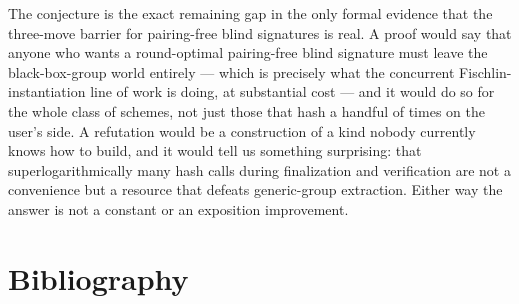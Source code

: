 \documentclass{conjura-conjecture}
\begin{document}
\begin{remark}\label{rem:consequence}
The conjecture is the exact remaining gap in the only formal evidence
that the three-move barrier for pairing-free blind signatures is real. A
proof would say that anyone who wants a round-optimal pairing-free blind
signature must leave the black-box-group world entirely --- which is
precisely what the concurrent Fischlin-instantiation line of work is
doing, at substantial cost --- and it would do so for the whole class of
schemes, not just those that hash a handful of times on the user's side.
A refutation would be a construction of a kind nobody currently knows
how to build, and it would tell us something surprising: that
superlogarithmically many hash calls during finalization and
verification are not a convenience but a resource that defeats
generic-group extraction. Either way the answer is not a constant or an
exposition improvement.
\end{remark}

\section{Bibliography}
\end{document}
